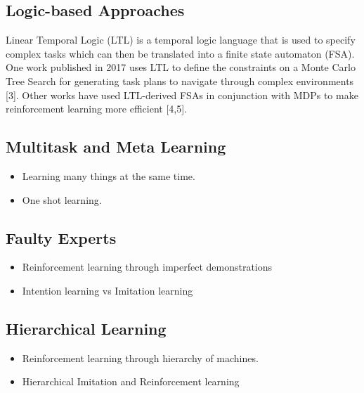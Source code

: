 \documentclass[letterpaper, 10 pt, conference]{ieeeconf}  %
\begin{document}
\subsection{Logic-based Approaches}

Linear Temporal Logic (LTL) is a temporal logic language that is used to specify complex tasks which can then be translated into a finite state automaton (FSA). One work published in 2017 uses LTL to define the constraints on a Monte Carlo Tree Search for generating task plans to navigate through complex environments [3]. Other works have used LTL-derived FSAs in conjunction with MDPs to make reinforcement learning more efficient [4,5].

\subsection{Multitask and Meta Learning}

\begin{itemize}
  \item Learning many things at the same time.
  \item One shot learning.
\end{itemize}

\subsection{Faulty Experts}

\begin{itemize}
  \item Reinforcement learning through imperfect demonstrations
  \item Intention learning vs Imitation learning
\end{itemize}

\subsection{Hierarchical Learning}

\begin{itemize}
  \item Reinforcement learning through hierarchy of machines.
  \item Hierarchical Imitation and Reinforcement learning
\end{itemize}
\end{document}
